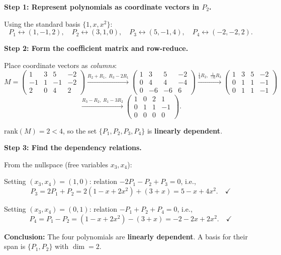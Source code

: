 \documentclass[12pt,a3paper]{article}
\begin{document}
\begin{tcolorbox}[enhanced,breakable,
  colback=cC!4,colframe=cC,boxrule=0.8pt,arc=5pt,
  title={\textbf{Answer --- Linear Independence of Polynomials $P_1, P_2, P_3, P_4$}},
  fonttitle=\bfseries\color{white},colbacktitle=cC]

\textbf{Step 1: Represent polynomials as coordinate vectors in $P_2$.}

Using the standard basis $\{1, x, x^2\}$:
\[
P_1 \leftrightarrow (1,-1,2),\quad P_2 \leftrightarrow (3,1,0),\quad
P_3 \leftrightarrow (5,-1,4),\quad P_4 \leftrightarrow (-2,-2,2).
\]

\textbf{Step 2: Form the coefficient matrix and row-reduce.}

Place coordinate vectors as \emph{columns}:
\[
M = \begin{pmatrix}
 1 &  3 &  5 & -2 \\
-1 &  1 & -1 & -2 \\
 2 &  0 &  4 &  2
\end{pmatrix}
\xrightarrow{R_2+R_1,\;R_3-2R_1}
\begin{pmatrix}
1 & 3 & 5 & -2 \\
0 & 4 & 4 & -4 \\
0 &-6 &-6 &  6
\end{pmatrix}
\xrightarrow{\frac{1}{4}R_2,\;\frac{1}{-6}R_3}
\begin{pmatrix}
1 & 3 & 5 & -2 \\
0 & 1 & 1 & -1 \\
0 & 1 & 1 & -1
\end{pmatrix}
\]
\[
\xrightarrow{R_3 - R_2,\;R_1 - 3R_2}
\begin{pmatrix}
1 & 0 & 2 & 1 \\
0 & 1 & 1 &-1 \\
0 & 0 & 0 & 0
\end{pmatrix}.
\]

$\mathrm{rank}(M) = 2 < 4$, so the set $\{P_1, P_2, P_3, P_4\}$ is \textbf{linearly dependent}.

\medskip
\textbf{Step 3: Find the dependency relations.}

From the nullspace (free variables $x_3, x_4$):

Setting $(x_3,x_4)=(1,0)$: relation $-2P_1 - P_2 + P_3 = 0$, i.e.,
\[
P_3 = 2P_1 + P_2 = 2(1-x+2x^2)+(3+x) = 5 - x + 4x^2.\quad\checkmark
\]

Setting $(x_3,x_4)=(0,1)$: relation $-P_1 + P_2 + P_4 = 0$, i.e.,
\[
P_4 = P_1 - P_2 = (1-x+2x^2)-(3+x) = -2 - 2x + 2x^2.\quad\checkmark
\]

\medskip
\textbf{Conclusion:} The four polynomials are \textbf{linearly dependent}. A basis for their span is $\{P_1, P_2\}$ with $\dim = 2$.

\end{tcolorbox}
\end{document}
